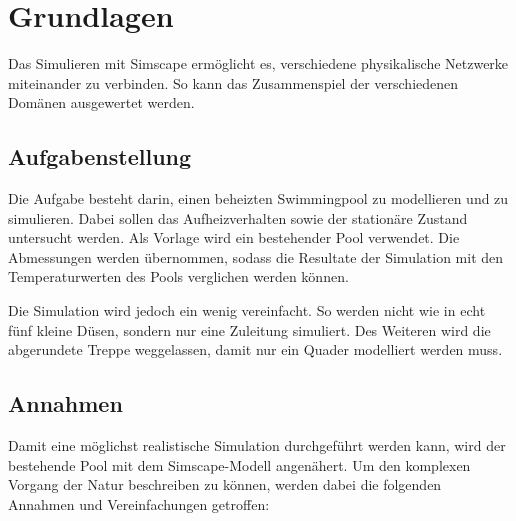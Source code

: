 \section{Grundlagen}
\label{sec:Grundlagen}
Das Simulieren mit Simscape ermöglicht es, verschiedene physikalische Netzwerke miteinander zu verbinden. So kann das Zusammenspiel der verschiedenen Domänen ausgewertet werden.

\subsection{Aufgabenstellung}
\label{subsec:Aufgabenstellung}
Die Aufgabe besteht darin, einen beheizten Swimmingpool zu modellieren und zu simulieren. Dabei sollen das Aufheizverhalten sowie der stationäre Zustand untersucht werden. Als Vorlage wird ein bestehender Pool verwendet. Die Abmessungen werden übernommen, sodass die Resultate der Simulation mit den Temperaturwerten des Pools verglichen werden können.

Die Simulation wird jedoch ein wenig vereinfacht. So werden nicht wie in echt fünf kleine Düsen, sondern nur eine Zuleitung simuliert. Des Weiteren wird die abgerundete Treppe weggelassen, damit nur ein Quader modelliert werden muss.

\subsection{Annahmen}
\label{subsec:Annahmen}
Damit eine möglichst realistische Simulation durchgeführt werden kann, wird der bestehende Pool mit dem Simscape-Modell angenähert. Um den komplexen Vorgang der Natur beschreiben zu können, werden dabei die folgenden Annahmen und Vereinfachungen getroffen:


